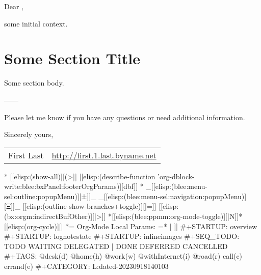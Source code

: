 \begin{whenOrg}
\bigskip


\begin{comment}
*  [[elisp:(org-cycle)][| ]]  *Memo Headers Starts*                       ::  [[elisp:(beginning-of-buffer)][Top]]  [[elisp:(delete-other-windows)][(1)]]  [[elisp:(org-cycle)][| ]]
\end{comment}


\begin{htmlonly}
\end{htmlonly}


Dear  ,

some initial context.


\section*{Some Section Title}

Some section body.


\bigskip

------

\bigskip

Please let me know if you have any questions or need additional information.

\bigskip

Sincerely yours,

\begin{tabular}{p{2.5in} p{3.5in}} \hline
\multicolumn{1}{c}{First Last}       & \multicolumn{1}{c}{\url{http://first.1.last.byname.net}}\\
\end{tabular}


\begin{whenOrg}
* [[elisp:(show-all)][(>]] [[elisp:(describe-function 'org-dblock-write:blee:bxPanel:footerOrgParams)][dbf]]
*  _[[elisp:(blee:menu-sel:outline:popupMenu)][±]]_ _[[elisp:(blee:menu-sel:navigation:popupMenu)][Ξ]]_ [[elisp:(outline-show-branches+toggle)][|=]] [[elisp:(bx:orgm:indirectBufOther)][|>]] *[[elisp:(blee:ppmm:org-mode-toggle)][|N]]*     [[elisp:(org-cycle)][| *= Org-Mode Local Params: =* | ]]
#+STARTUP: overview
#+STARTUP: lognotestate
#+STARTUP: inlineimages
#+SEQ_TODO: TODO WAITING DELEGATED | DONE DEFERRED CANCELLED
#+TAGS: @desk(d) @home(h) @work(w) @withInternet(i) @road(r) call(c) errand(e)
#+CATEGORY: L:dated-20230918140103
\end{whenOrg}


\end{whenOrg}
